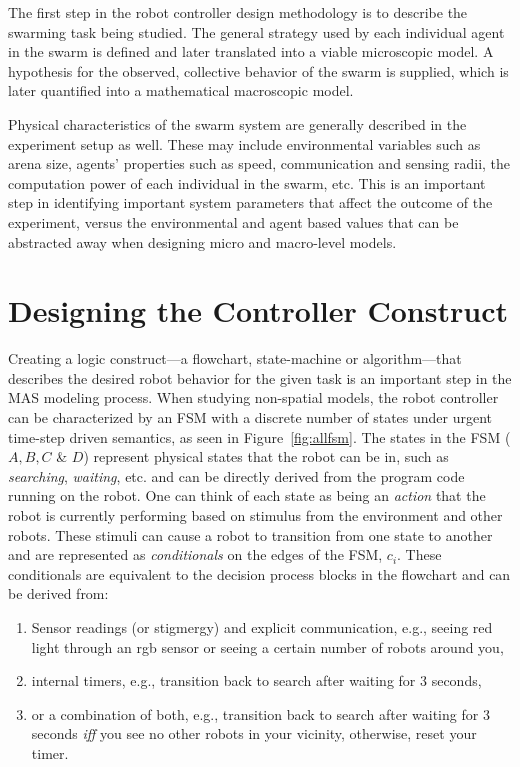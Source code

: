 \documentclass[defaultstyle,12pt]{proposal}
\begin{document}
The first step in the robot controller design methodology is to describe the swarming task being studied. The general strategy used by each individual agent in the swarm is defined and later translated into a viable microscopic model. A hypothesis for the observed, collective behavior of the swarm is supplied, which is later quantified into a mathematical macroscopic model.

Physical characteristics of the swarm system are generally described in the experiment setup as well. These may include environmental variables such as arena size, agents' properties such as speed, communication and sensing radii, the computation power of each individual in the swarm, etc. This is an important step in identifying important system parameters that affect the outcome of the experiment, versus the environmental and agent based values that can be abstracted away when designing micro and macro-level models.
 
\section{Designing the Controller Construct}
Creating a logic construct---a flowchart, state-machine or algorithm---that describes the desired robot behavior for the given task is an important step in the MAS modeling process. When studying non-spatial models, the robot controller can be characterized by an FSM with a discrete number of states under urgent time-step driven semantics, as seen in Figure~\ref{fig:allfsm}. The states in the FSM ($A, B, C$ \& $D$) represent physical states that the robot can be in, such as  \emph{searching}, \emph{waiting}, etc. and can be directly derived from the program code running on the robot. One can think of each state as being an \emph{action} that the robot is currently performing based on stimulus from the environment and other robots. These stimuli can cause a robot to transition from one state to another and are represented as \emph{conditionals} on the edges of the FSM, $c_i$. These conditionals are equivalent to the decision process blocks in the flowchart and can be derived from:
\begin{enumerate}
\item Sensor readings (or stigmergy) and explicit communication, e.g., seeing red light through an rgb sensor or seeing a certain number of robots around you,
\item internal timers, e.g., transition back to search after waiting for 3 seconds,
\item or a combination of both, e.g., transition back to search after waiting for 3 seconds \emph{iff} you see no other robots in your vicinity, otherwise, reset your timer.
\end{enumerate}
\end{document}
